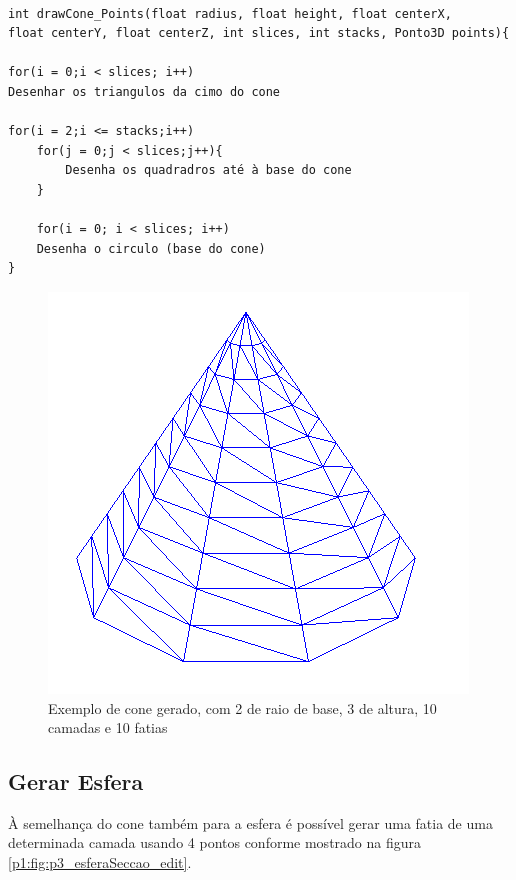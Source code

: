 \begin{Verbatim}

int drawCone_Points(float radius, float height, float centerX, 
float centerY, float centerZ, int slices, int stacks, Ponto3D points){

for(i = 0;i < slices; i++)
Desenhar os triangulos da cimo do cone

for(i = 2;i <= stacks;i++)
	for(j = 0;j < slices;j++){
		Desenha os quadradros até à base do cone
	}
	
	for(i = 0; i < slices; i++)
	Desenha o circulo (base do cone)
}

\end{Verbatim}


\begin{figure}[<+htpb+>]
	\centering
	\includegraphics[scale=0.5]{imagens/p3_cone_2_3_10_10.png}
	\caption{Exemplo de cone gerado, com 2 de raio de base, 3 de altura, 10 camadas e 10 fatias}
	\label{p1:fig:p3_cone_2_3_10_10}
\end{figure}

\newpage
\subsection{Gerar Esfera}


À semelhança do cone também para a esfera é possível gerar uma fatia de uma determinada camada usando 4 pontos conforme mostrado na figura \ref{p1:fig:p3_esferaSeccao_edit}.

